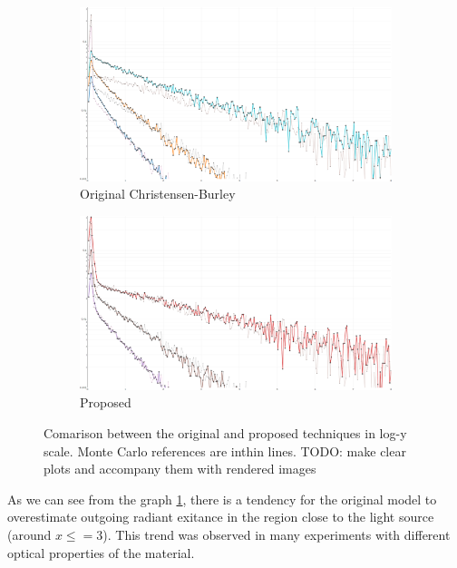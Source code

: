 \begin{figure}
    \centering
    \begin{subfigure}{0.48\textwidth}
        \includegraphics[width=\textwidth]{imgs/plots/burley_old_fitting}
        \caption{Original Christensen-Burley}
    \end{subfigure}
    \quad
    \begin{subfigure}{0.48\textwidth}
        \includegraphics[width=\textwidth]{imgs/plots/burley_new_fitting}
        \caption{Proposed}
    \end{subfigure}

    \caption{Comarison between the original and proposed techniques in log-y
    scale. Monte Carlo references are inthin lines. TODO: make clear plots and
    accompany them with rendered images}
    \label{fig:burley_fitting}
\end{figure}

As we can see from the graph \ref{fig:burley_fitting}, there is a tendency for
the original model to overestimate outgoing radiant exitance in the region close
to the light source (around $x\leq=3$). This trend was observed in many
experiments with different optical properties of the material.

